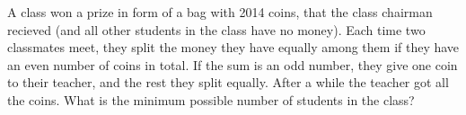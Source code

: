 \problem
A class won a prize in form of a bag with 2014 coins, that the class chairman
recieved (and all other students in the class have no money).
Each time two classmates meet, they split the money they have equally among
them if they have an even number of coins in total.
If the sum is an odd number, they give one coin to their teacher, and the rest
they split equally.
After a while the teacher got all the coins.
What is the minimum possible number of students in the class?
\solution
\endproblem
